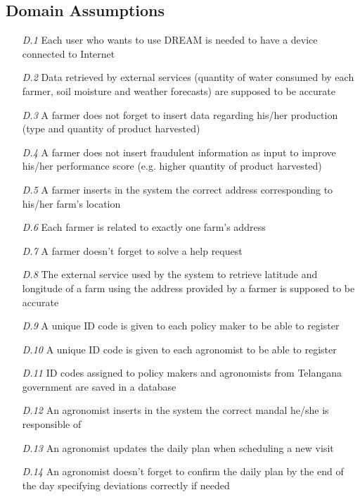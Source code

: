 \subsection{Domain Assumptions}

\begin{itemize}
    \item [\textit{D.1}] Each user who wants to use DREAM is needed to have a device connected to Internet 
    \item [\textit{D.2}] Data retrieved by external services (quantity of water consumed by each farmer, soil moisture and weather forecasts) are supposed to be accurate 
    \item [\textit{D.3}] A farmer does not forget to insert data regarding his/her production (type and quantity of product harvested)
    \item [\textit{D.4}] A farmer does not insert fraudulent information as input to  improve his/her performance score (e.g. higher quantity of product harvested)
    \item [\textit{D.5}] A farmer inserts in the system the correct address
    corresponding to his/her farm's location
    \item [\textit{D.6}] Each farmer is related to exactly one farm's address
    \item [\textit{D.7}] A farmer doesn't forget to solve a help request
    \item [\textit{D.8}]The external service used by the system to retrieve latitude and longitude of a farm using the address provided by a farmer is supposed to be accurate
    \item [\textit{D.9}] A unique ID code is given to each policy maker to be able to register
    \item [\textit{D.10}] A unique ID code is given to each agronomist to be able to register
    \item [\textit{D.11}] ID codes assigned to policy makers and agronomists from Telangana government are saved in a database
    \item [\textit{D.12}] An agronomist inserts in the system the correct mandal he/she is responsible of
    \item [\textit{D.13}] An agronomist updates the daily plan when scheduling a new visit
    \item [\textit{D.14}] An agronomist doesn't forget to confirm the daily plan by the end of the day specifying deviations correctly if needed
\end{itemize}

